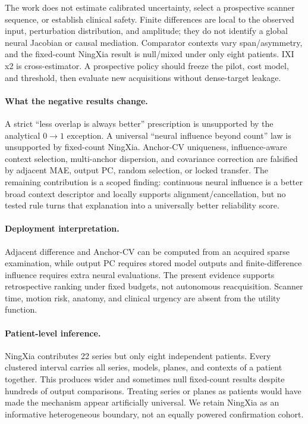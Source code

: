 \documentclass[10pt,twocolumn,letterpaper]{article}
\begin{document}
The work does not estimate calibrated uncertainty, select a prospective scanner sequence, or establish clinical safety. Finite differences are local to the observed input, perturbation distribution, and amplitude; they do not identify a global neural Jacobian or causal mediation. Comparator contexts vary span/asymmetry, and the fixed-count NingXia result is null/mixed under only eight patients. IXI x2 is cross-estimator. A prospective policy should freeze the pilot, cost model, and threshold, then evaluate new acquisitions without dense-target leakage.

\paragraph{What the negative results change.} A strict ``less overlap is always better'' prescription is unsupported by the analytical $0\rightarrow1$ exception. A universal ``neural influence beyond count'' law is unsupported by fixed-count NingXia. Anchor-CV uniqueness, influence-aware context selection, multi-anchor dispersion, and covariance correction are falsified by adjacent MAE, output PC, random selection, or locked transfer. The remaining contribution is a scoped finding: continuous neural influence is a better broad context descriptor and locally supports alignment/cancellation, but no tested rule turns that explanation into a universally better reliability score.

\paragraph{Deployment interpretation.} Adjacent difference and Anchor-CV can be computed from an acquired sparse examination, while output PC requires stored model outputs and finite-difference influence requires extra neural evaluations. The present evidence supports retrospective ranking under fixed budgets, not autonomous reacquisition. Scanner time, motion risk, anatomy, and clinical urgency are absent from the utility function.

\paragraph{Patient-level inference.} NingXia contributes 22 series but only eight independent patients. Every clustered interval carries all series, models, planes, and contexts of a patient together. This produces wider and sometimes null fixed-count results despite hundreds of output comparisons. Treating series or planes as patients would have made the mechanism appear artificially universal. We retain NingXia as an informative heterogeneous boundary, not an equally powered confirmation cohort.
\end{document}
